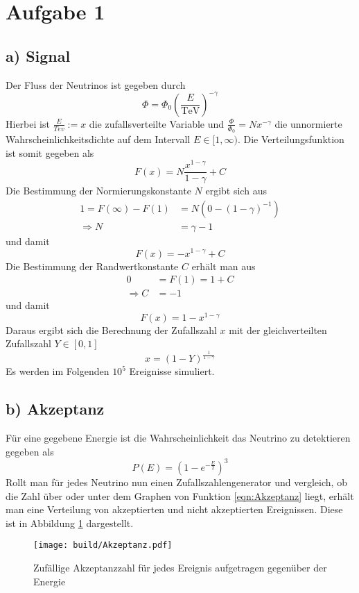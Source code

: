 \section{Aufgabe 1}
\label{sec:Aufgabe1}

\subsection*{a) Signal}
Der Fluss der Neutrinos ist gegeben durch
\begin{equation}
    \Phi = \Phi_0 \left(\frac{E}{\text{TeV}}\right)^{-\gamma}
\end{equation}
Hierbei ist $\frac{E}{Tev}:=x$ die zufallsverteilte Variable und $\frac{\Phi}{\Phi_0}=Nx^{-\gamma}$ die unnormierte Wahrscheinlichkeitsdichte auf dem Intervall $E\in [1,\infty)$.
Die Verteilungsfunktion ist somit gegeben als
\begin{equation}
    F(x)=N\frac{x^{1-\gamma}}{1-\gamma}+C
\end{equation}
Die Bestimmung der Normierungskonstante $N$ ergibt sich aus
\begin{align}
    1=F(\infty)-F(1)&=N\left(0-(1-\gamma)^{-1}\right)\\
    \Rightarrow N&=\gamma-1
\end{align}
und damit
\begin{equation}
    F(x)=-x^{1-\gamma} + C
\end{equation}
Die Bestimmung der Randwertkonstante $C$ erhält man aus
\begin{align}
    0&=F(1)=1+C\\
    \Rightarrow C&=-1
\end{align}
und damit
\begin{equation}
    F(x)=1-x^{1-\gamma}
\end{equation}
Daraus ergibt sich die Berechnung der Zufallszahl $x$ mit der gleichverteilten Zufallszahl $Y\in [0,1]$
\begin{equation}
    x=(1-Y)^{\frac{1}{1-\gamma}}
\end{equation}
Es werden im Folgenden $10^5$ Ereignisse simuliert.
\subsection*{b) Akzeptanz}
Für eine gegebene Energie ist die Wahrscheinlichkeit das Neutrino zu detektieren gegeben als
\begin{equation}
    P(E)=\left(1-e^{-\frac{E}{2}}\right)^3
    \label{eqn:Akzeptanz}
\end{equation}
Rollt man für jedes Neutrino nun einen Zufallszahlengenerator und vergleich, ob die Zahl über oder unter dem Graphen von Funktion \eqref{eqn:Akzeptanz} liegt, erhält man eine Verteilung von akzeptierten und nicht akzeptierten Ereignissen.
Diese ist in Abbildung \ref{fig:Akzeptanz} dargestellt.
\begin{figure}
    \centering
    \texttt{[image: build/Akzeptanz.pdf]}
    \caption{Zufällige Akzeptanzzahl für jedes Ereignis aufgetragen gegenüber der Energie}
    \label{fig:Akzeptanz}
\end{figure}

